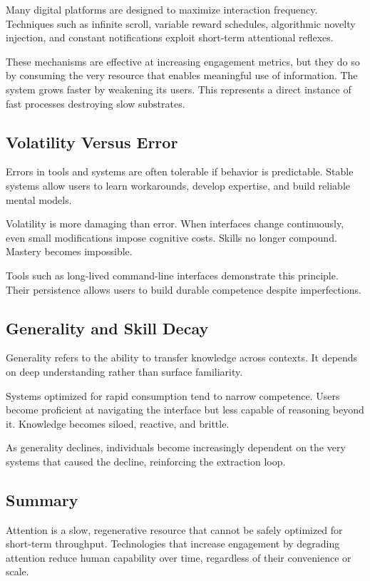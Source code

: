 \documentclass[12pt]{article} \usepackage[margin=1in]{geometry} \usepackage{setspace} \usepackage{amsmath,amssymb} \usepackage{hyperref}
\begin{document}
Many digital platforms are designed to maximize interaction frequency. Techniques such as infinite scroll, variable reward schedules, algorithmic novelty injection, and constant notifications exploit short-term attentional reflexes.

These mechanisms are effective at increasing engagement metrics, but they do so by consuming the very resource that enables meaningful use of information. The system grows faster by weakening its users. This represents a direct instance of fast processes destroying slow substrates.

\subsection{Volatility Versus Error}

Errors in tools and systems are often tolerable if behavior is predictable. Stable systems allow users to learn workarounds, develop expertise, and build reliable mental models.

Volatility is more damaging than error. When interfaces change continuously, even small modifications impose cognitive costs. Skills no longer compound. Mastery becomes impossible.

Tools such as long-lived command-line interfaces demonstrate this principle. Their persistence allows users to build durable competence despite imperfections.

\subsection{Generality and Skill Decay}

Generality refers to the ability to transfer knowledge across contexts. It depends on deep understanding rather than surface familiarity.

Systems optimized for rapid consumption tend to narrow competence. Users become proficient at navigating the interface but less capable of reasoning beyond it. Knowledge becomes siloed, reactive, and brittle.

As generality declines, individuals become increasingly dependent on the very systems that caused the decline, reinforcing the extraction loop.

\subsection{Summary}

Attention is a slow, regenerative resource that cannot be safely optimized for short-term throughput. Technologies that increase engagement by degrading attention reduce human capability over time, regardless of their convenience or scale.
\end{document}
